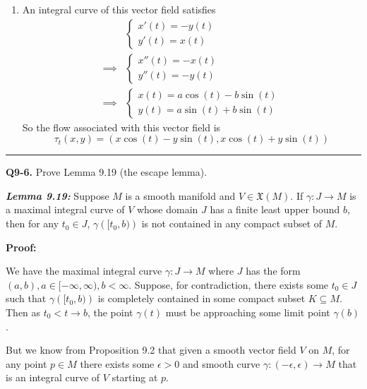 \documentclass{article}
\begin{document}
\begin{enumerate}[label=(\alph*)]
  \vskip 0.5cm
  \item An integral curve of this vector field satisfies 
  \begin{align*}
    &\begin{cases}
      x'(t) = -y(t) \\
      y'(t) = x(t)
    \end{cases} \\
    \implies& \begin{cases}
      x''(t) = -x(t) \\
      y''(t) = -y(t) 
    \end{cases} \\
    \implies& \begin{cases}
      x(t) = a\cos(t) - b\sin(t) \\
      y(t) = a\sin(t) + b\sin(t)
    \end{cases}
  \end{align*}
  So the flow associated with this vector field is \[ \boxed{\tau_t(x, y) = \left(x\cos(t) - y\sin(t), x\cos(t) + y\sin(t)\right)}  \]
\end{enumerate}


\vskip 0.5cm
\hrule 
\vskip 0.5cm



\textbf{Q9-6.} Prove Lemma 9.19 (the escape lemma). 

\vskip 0.5cm
\begin{dottedbox}
  \textbf{\emph{Lemma 9.19:}} Suppose $M$ is a smooth manifold and $V \in \mathfrak{X}(M)$. If $\gamma : J \rightarrow M$ is a maximal integral curve of $V$ whose domain $J$ has a finite least upper bound $b$, then for any $t_0 \in J$, $\gamma \left( [t_0, b) \right)$ is not contained in any compact subset of $M$.
\end{dottedbox}

\vskip 0.5cm
\textbf{Proof:}

We have the maximal integral curve $\gamma : J \rightarrow M$ where $J$ has the form $(a,b), a \in [-\infty, \infty), b < \infty$. Suppose, for contradiction, there exists some $t_0 \in J$ such that $\gamma \left([t_0, b)\right)$ is completely contained in some compact subset $K \subseteq M$. Then as $t_0 < t \rightarrow b$, the point $\gamma(t)$ must be approaching some limit point $\gamma(b)$. 

\vskip 0.5cm
But we know from Proposition 9.2 that given a smooth vector field $V$ on $M$, for any point $p \in M$ there exists some $\epsilon > 0$ and smooth curve $\gamma : (-\epsilon, \epsilon) \rightarrow M$ that is an integral curve of $V$ starting at $p$.
\end{document}
